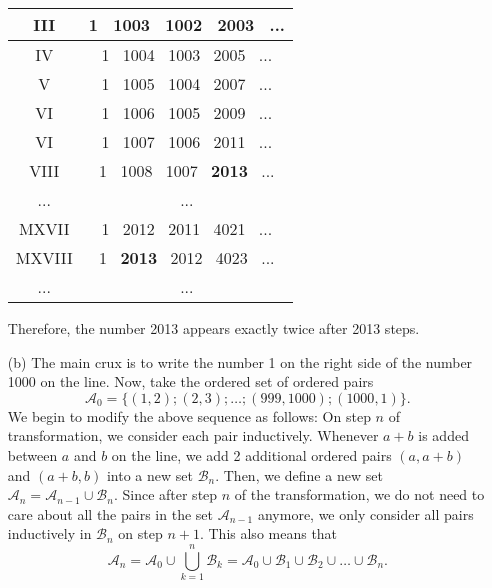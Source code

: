 \documentclass[11pt]{article}
\begin{document}
\begin{solution}
\begin{enumerate}
                \begin{center}
                    \begin{tabular}{ |c|c| } 
                        \hline
                        III & 1 \ 1003 \ 1002 \ 2003 \ ... \\
                        \hline
                        IV & 1 \ 1004 \ 1003 \ 2005 \ ... \\
                        \hline
                        V & 1 \ 1005 \ 1004 \ 2007 \ ... \\
                        \hline
                        VI & 1 \ 1006 \ 1005 \ 2009 \ ... \\
                        \hline
                        VI & 1 \ 1007 \ 1006 \ 2011 \ ... \\
                        \hline
                        VIII & 1 \ 1008 \ 1007 \ \textbf{2013} \ ... \\
                        \hline
                        ... & ... \\
                        \hline
                        MXVII & 1 \ 2012 \ 2011 \ 4021 \ ... \\
                        \hline
                        MXVIII & 1 \ \textbf{2013} \ 2012 \ 4023 \ ... \\
                        \hline
                        ... & ... \\
                        \hline
                    \end{tabular}
                \end{center}
                
                \boom
                
                Therefore, the number 2013 appears exactly twice after 2013 steps.
                
                \item[(b)] The main crux is to write the number 1 on the right side of the number 1000 on the line. Now, take the ordered set of ordered pairs
                \[\mathcal{A}_0 = \{(1,2); (2,3); \dots; (999,1000); (1000,1)\}.\]
                We begin to modify the above sequence as follows: On step \(n\) of transformation, we consider each pair inductively. Whenever \(a + b\) is added between \(a\) and \(b\) on the line, we add 2 additional ordered pairs \((a,a + b)\) and \((a + b,b)\) into a new set \(\mathcal{B}_n\). Then, we define a new set \(\mathcal{A}_n = \mathcal{A}_{n-1} \cup \mathcal{B}_n\). Since after step \(n\) of the transformation, we do not need to care about all the pairs in the set \(\mathcal{A}_{n-1}\) anymore, we only consider all pairs inductively in \(\mathcal{B}_n\) on step \(n + 1\). This also means that
                \[\mathcal{A}_n = \mathcal{A}_0 \cup \bigcup_{k=1}^n \mathcal{B}_k = \mathcal{A}_0 \cup \mathcal{B}_1 \cup \mathcal{B}_2 \cup \dots \cup \mathcal{B}_n.\]


\end{enumerate}
\end{solution}
\end{document}
